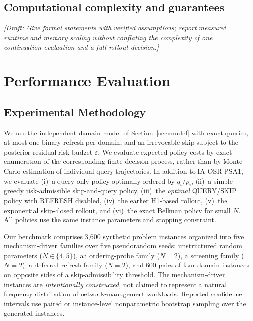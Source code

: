 \documentclass[conference]{IEEEtran}
\newcommand{\TODO}[1]{\textit{[Draft: #1]}}
\begin{document}
\subsection{Computational complexity and guarantees}
\TODO{Give formal statements with verified assumptions; report measured
runtime and memory scaling without conflating the complexity of one
continuation evaluation and a full rollout decision.}

\section{Performance Evaluation}
\label{sec:eval}
\subsection{Experimental Methodology}
We use the independent-domain model of Section~\ref{sec:model} with
exact queries, at most one binary refresh per domain, and an
irrevocable skip subject to the posterior residual-risk budget
$\varepsilon$. We evaluate expected policy costs by exact enumeration
of the corresponding finite decision process, rather than by
Monte Carlo estimation of individual query trajectories. In addition
to IA-OSR-PSA1, we evaluate (i)~a query-only policy optimally ordered
by $q_i/p_i$, (ii)~a simple greedy risk-admissible skip-and-query
policy, (iii)~the \emph{optimal} QUERY/SKIP policy with REFRESH disabled,
(iv)~the earlier H1-based rollout, (v)~the exponential
skip-closed rollout, and (vi)~the exact Bellman policy for small $N$.
All policies use the same instance parameters and stopping constraint.

Our benchmark comprises 3,600 synthetic problem instances organized
into five mechanism-driven families over five pseudorandom seeds:
unstructured random parameters ($N\in\{4,5\}$), an ordering-probe
family ($N=2$), a screening family ($N=2$), a deferred-refresh family
($N=2$), and 600 pairs of four-domain instances on opposite sides of
a skip-admissibility threshold. The mechanism-driven instances are
\emph{intentionally constructed}, not claimed to represent a natural
frequency distribution of network-management workloads. Reported
confidence intervals use paired or instance-level nonparametric
bootstrap sampling over the generated instances.
\end{document}
